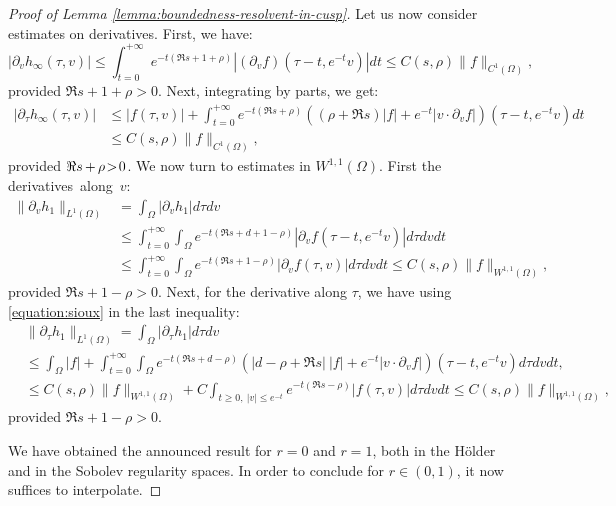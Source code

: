 \documentclass[10pt]{amsart}
\theoremstyle{plain}
\theoremstyle{definition}
\begin{document}
\begin{proof}[Proof of Lemma \ref{lemma:boundedness-resolvent-in-cusp}]
Let us now consider estimates on derivatives. First, we have:
\[
|\partial_v h_\infty(\tau,v)| \leq \int_{t=0}^{+\infty} e^{-t(\Re s + 1 + \rho)} |(\partial_v f)(\tau- t, e^{-t} v)| dt \leq C(s,\rho) \|f\|_{C^1(\Omega)},
\]
provided $\Re s + 1 + \rho>0$. Next, integrating by parts, we get:
\[
\begin{split}
|\partial_\tau h_\infty(\tau,v)| &\leq |f(\tau,v)| + \int_{t=0}^{+\infty} e^{-t(\Re s + \rho)} \left( (\rho+\Re s)|f| + e^{-t} |v\cdot\partial_v f|\right)(\tau- t, e^{-t} v) dt \\
&\leq C(s,\rho) \|f\|_{C^1(\Omega)},
\end{split}
\]
provided $\Re s \mkern-1mu+\mkern-1mu \rho \!>\!0$. We now turn to estimates in $W^{1,1}(\Omega)$. First the derivatives~along~$v$:
\[
\begin{split}
\|\partial_v h_1\|_{L^1(\Omega)} &= \int_{\Omega} |\partial_v h_1| d\tau dv \\
& \leq \int_{t=0}^{+\infty} \int_{\Omega} e^{-t(\Re s+d + 1-\rho)} |\partial_vf(\tau - t, e^{-t} v)| d\tau dv dt \\
&\leq \int_{t= 0}^{+\infty} \int_{\Omega} e^{-t(\Re s + 1-\rho)} |\partial_v f(\tau, v)| d\tau dv dt \leq C(s,\rho) \|f\|_{W^{1,1}(\Omega)},
\end{split}
\]
provided $\Re s + 1 - \rho > 0$. Next, for the derivative along $\tau$, we have using \eqref{equation:sioux} in the last inequality:
\[
\begin{split}
&\|\partial_\tau h_1\|_{L^1(\Omega)} = \int_{\Omega} |\partial_\tau h_1| d\tau dv \\
& \leq \int_{\Omega} |f| + \int_{t=0}^{+\infty}\int_{\Omega} e^{-t(\Re s + d - \rho)} \left( |d - \rho+\Re s|\ |f| + e^{-t} |v\cdot\partial_v f|\right)(\tau- t, e^{-t} v) d\tau dv dt,\\
& \leq C(s,\rho)\|f\|_{W^{1,1}(\Omega)} + C \int_{t\geq 0,\ |v|\leq e^{-t}} e^{-t (\Re s - \rho)} |f(\tau, v)| d\tau dv dt \leq C(s,\rho) \|f\|_{W^{1,1}(\Omega)},
\end{split}
\]
provided $\Re s + 1 -\rho >0$.

We have obtained the announced result for $r=0$ and $r=1$, both in the Hölder and in the Sobolev regularity spaces. In order to conclude for $r \in (0,1)$, it now suffices to interpolate.
\end{proof}
\end{document}
